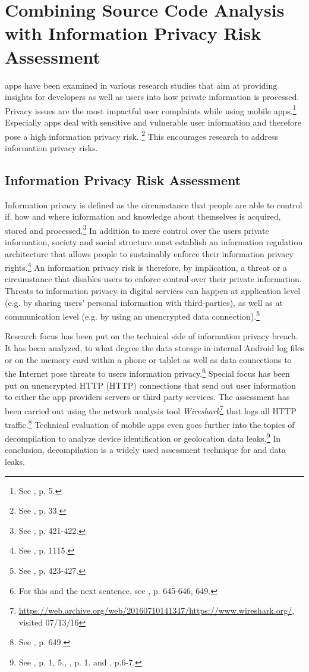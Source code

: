 \section{Combining Source Code Analysis with Information Privacy Risk Assessment}

\mH apps have been examined in various research studies that aim at providing insights for developers as well as users into how private information is processed.
Privacy issues are the most impactful user complaints while using mobile apps.\footnote{See \cite{Khalid2015}, p. 5.}
Especially \mH apps deal with sensitive and vulnerable user information and therefore pose a high information privacy risk. \footnote{See \cite{Kumar2013}, p. 33.}
This encourages research to address information privacy risks.

\subsection{Information Privacy Risk Assessment}

Information privacy is defined as the circumstance that people are able to control if, how and where information and knowledge about themselves is acquired, stored and processed.\footnote{See \cite{Fischer1998}, p. 421-422.}
In addition to mere control over the users private information, society and social structure must establish an information regulation architecture that allows people to sustainably enforce their information privacy rights.\footnote{See \cite{Solove2002}, p. 1115.}
An information privacy risk is therefore, by implication, a threat or a circumstance that disables users to enforce control over their private information.
Threats to information privacy in digital services can happen at application level (e.g. by sharing users' personal information with third-parties), as well as at communication level (e.g. by using an unencrypted data connection).\footnote{See \cite{Fischer1998}, p. 423-427.}

Research focus has been put on the technical side of information privacy breach. 
It has been analyzed, to what degree the data storage in internal Android log files or on the memory card within a phone or tablet as well as data connections to the Internet pose threats to users information privacy.\footnote{For this and the next sentence, see \cite{He2014}, p. 645-646, 649.}
Special focus has been put on unencrypted \acl{HTTP} (\acs{HTTP}) connections that send out user information to either the app providers servers or third party services.
The assessment has been carried out using the network analysis tool \textit{Wireshark}\footnote{\url{https://web.archive.org/web/20160710141347/https://www.wireshark.org/}, visited 07/13/16} that logs all HTTP traffic.\footnote{See \cite{He2014}, p. 649.}
Technical evaluation of mobile apps even goes further into the topics of decompilation to analyze device identification or geolocation data leaks.\footnote{See \cite{Mcclurg2012}, p. 1, 5., \cite{Enck2011}, p. 1. and \cite{Mitchell2013}, p.6-7.}
In conclusion, decompilation is a widely used assessment technique for \ipr and data leaks.

